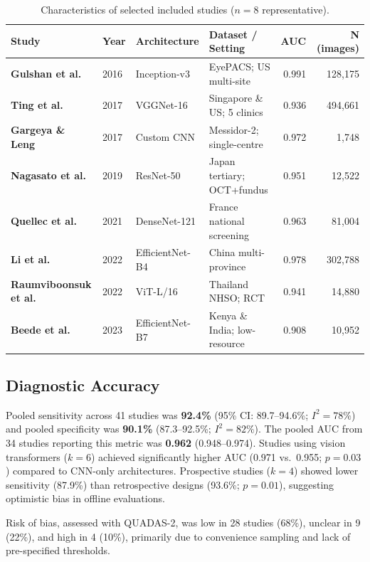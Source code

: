 \vspace{2mm}
\begin{table}[h!]
\centering
\caption{Characteristics of selected included studies (\(n = 8\) representative).}
\label{tab:studies}
\small
\begin{tabularx}{\linewidth}{@{}
  >{\bfseries}l
  l
  l
  >{\raggedright\arraybackslash}X
  r
  r
@{}}
\toprule
\color{accent}Study & \color{accent}Year & \color{accent}Architecture
  & \color{accent}Dataset / Setting
  & \color{accent}AUC & \color{accent}N (images) \\
\midrule
Gulshan et al.    & 2016 & Inception-v3   & EyePACS; US multi-site           & 0.991 & 128,175 \\
Ting et al.       & 2017 & VGGNet-16      & Singapore \& US; 5 clinics       & 0.936 & 494,661 \\
Gargeya \& Leng   & 2017 & Custom CNN     & Messidor-2; single-centre        & 0.972 &  1,748  \\
Nagasato et al.   & 2019 & ResNet-50      & Japan tertiary; OCT+fundus       & 0.951 & 12,522  \\
Quellec et al.    & 2021 & DenseNet-121   & France national screening        & 0.963 & 81,004  \\
Li et al.         & 2022 & EfficientNet-B4& China multi-province             & 0.978 & 302,788 \\
Raumviboonsuk et al.& 2022 & ViT-L/16     & Thailand NHSO; RCT               & 0.941 & 14,880  \\
Beede et al.      & 2023 & EfficientNet-B7& Kenya \& India; low-resource     & 0.908 & 10,952  \\
\bottomrule
\end{tabularx}
\end{table}

\subsection{Diagnostic Accuracy}

Pooled sensitivity across 41 studies was \textbf{92.4\%} (95\% CI: 89.7–94.6\%;
\(I^2 = 78\%\)) and pooled specificity was \textbf{90.1\%} (87.3–92.5\%;
\(I^2 = 82\%\)). The pooled AUC from 34 studies reporting this metric was \textbf{0.962}
(0.948–0.974). Studies using vision transformers (\(k = 6\)) achieved significantly
higher AUC (0.971 vs.\ 0.955; \(p = 0.03\)) compared to CNN-only architectures.
Prospective studies (\(k = 4\)) showed lower sensitivity (87.9\%) than retrospective
designs (93.6\%; \(p = 0.01\)), suggesting optimistic bias in offline evaluations.

Risk of bias, assessed with QUADAS-2, was low in 28 studies (68\%), unclear in 9 (22\%),
and high in 4 (10\%), primarily due to convenience sampling and lack of pre-specified
thresholds.

